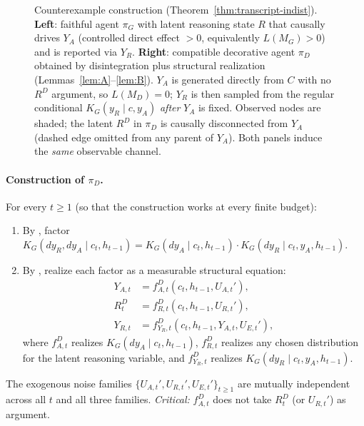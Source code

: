 \documentclass{article}
\theoremstyle{plain}
\theoremstyle{definition}
\theoremstyle{remark}
\begin{document}
\begin{figure}[ht]
\caption{Counterexample construction (Theorem~\ref{thm:transcript-indist}).
\textbf{Left}: faithful agent $\pi_G$ with latent reasoning state $R$ that
causally drives $Y_A$ (controlled direct effect $> 0$, equivalently $L(M_G) > 0$) and is reported via $Y_R$.
\textbf{Right}: compatible decorative agent $\pi_D$ obtained by disintegration
plus structural realization (Lemmas~\ref{lem:A}--\ref{lem:B}). $Y_A$ is
generated directly from $C$ with no $R^D$ argument, so $L(M_D) = 0$;
$Y_R$ is then sampled from the regular conditional $K_G(y_R \mid c, y_A)$
\emph{after} $Y_A$ is fixed. Observed nodes are shaded; the latent $R^D$ in
$\pi_D$ is causally disconnected from $Y_A$ (dashed edge omitted from any
parent of $Y_A$). Both panels induce the \emph{same} observable channel.}
\label{fig:counterexample}
\end{figure}

\paragraph{Construction of $\pi_D$.}
For every $t \ge 1$ (so that the construction works at every finite budget):
\begin{enumerate}
\item By , factor
$K_G(dy_R, dy_A \mid c_t, h_{t-1}) = K_G(dy_A \mid c_t, h_{t-1}) \cdot K_G(dy_R \mid c_t, y_A, h_{t-1})$.
\item By , realize each factor as a measurable structural equation:
\begin{align*}
Y_{A,t} &= f_{A,t}^D(c_t, h_{t-1}, U_{A,t}'),\\
R_t^D &= f_{R,t}^D(c_t, h_{t-1}, U_{R,t}'),\\
Y_{R,t} &= f_{Y_R,t}^D(c_t, h_{t-1}, Y_{A,t}, U_{E,t}'),
\end{align*}
where $f_{A,t}^D$ realizes $K_G(dy_A \mid c_t, h_{t-1})$, $f_{R,t}^D$ realizes
any chosen distribution for the latent reasoning variable, and $f_{Y_R,t}^D$
realizes $K_G(dy_R \mid c_t, y_A, h_{t-1})$.
\end{enumerate}
The exogenous noise families $\{U_{A,t}', U_{R,t}', U_{E,t}'\}_{t \ge 1}$ are
mutually independent across all $t$ and all three families. \emph{Critical:}
$f_{A,t}^D$ does not take $R_t^D$ (or $U_{R,t}'$) as argument.
\end{document}
